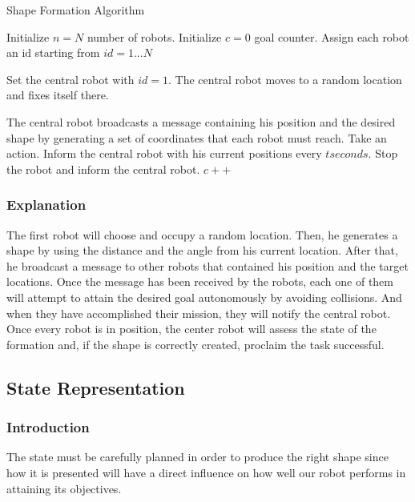 \documentclass[12pt]{extarticle}
\begin{document}
\begin{algorithm}[H]
\caption{Shape Formation Algorithm}
\label{alg:ddpg}
\begin{algorithmic}[1]

\State Initialize $n=N$ number of robots.
\State Initialize $c=0$ goal counter.
\State Assign each robot an id starting from $id=1...N$

\State Set the central robot with $id=1$.
\State The central robot moves to a random location and fixes itself there.

\State The central robot broadcasts a message containing his position and the desired shape by generating a set of coordinates that each robot must reach.
\State Take an action.
\State Inform the central robot with his current positions every $t seconds$.
    \State Stop the robot and inform the central robot.
    \State $c++$ 

\EndIf 

\EndFor

\EndWhile

\end{algorithmic}
\end{algorithm}

\subsubsection{Explanation}



The first robot will choose and occupy a random location. Then, he generates a shape by using the distance and the angle from his current location. After that, he broadcast a message to other robots that contained his position and the target locations. Once the message has been received by the robots, each one of them will attempt to attain the desired goal autonomously by avoiding collisions. And when they have accomplished their mission, they will notify the central robot. Once every robot is in position, the center robot will assess the state of the formation and, if the shape is correctly created, proclaim the task successful.




\subsection{State Representation}

\subsubsection{Introduction}
The state must be carefully planned in order to produce the right shape since how it is presented will have a direct influence on how well our robot performs in attaining its objectives.
\end{document}
